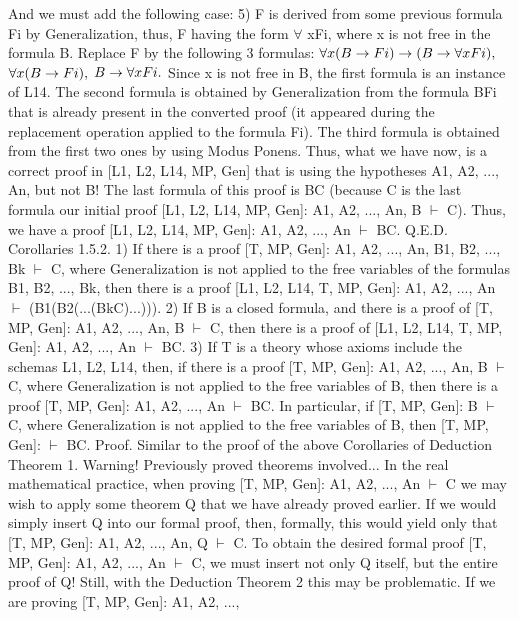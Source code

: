 And we must add the following case:
5) F is derived from some previous formula Fi by Generalization, thus, F having the form \(\forall\) xFi, where x
is not free in the formula B. Replace F by the following 3 formulas:
\(\forall x(B\rightarrow Fi)\rightarrow (B\rightarrow \forall xFi),\)
\(\forall x(B\rightarrow Fi),\)
\(B\rightarrow \forall xFi.\)
Since x is not free in B, the first formula is an instance of L14. The second formula is obtained by
Generalization from the formula B\IMPLIES Fi that is already present in the converted proof (it appeared during
the replacement operation applied to the formula Fi). The third formula is obtained from the first two ones
by using Modus Ponens.
Thus, what we have now, is a correct proof in [L1, L2, L14, MP, Gen] that is using the hypotheses A1,
A2, ..., An, but not B! The last formula of this proof is B\IMPLIES C (because C is the last formula our initial
proof [L1, L2, L14, MP, Gen]: A1, A2, ..., An, B \(\vdash\) C). Thus, we have a proof [L1, L2, L14, MP, Gen]: A1,
A2, ..., An \(\vdash\) B\IMPLIES C. Q.E.D.
Corollaries 1.5.2. 1) If there is a proof [T, MP, Gen]: A1, A2, ..., An, B1, B2, ..., Bk \(\vdash\) C, where
Generalization is not applied to the free variables of the formulas B1, B2, ..., Bk, then there is a proof [L1,
L2, L14, T, MP, Gen]: A1, A2, ..., An \(\vdash\) (B1\IMPLIES (B2\IMPLIES (...\IMPLIES (Bk\IMPLIES C)...))).
2) If B is a closed formula, and there is a proof of [T, MP, Gen]: A1, A2, ..., An, B \(\vdash\) C, then there is a
proof of [L1, L2, L14, T, MP, Gen]: A1, A2, ..., An \(\vdash\) B\IMPLIES C.
3) If T is a theory whose axioms include the schemas L1, L2, L14, then, if there is a proof [T, MP, Gen]:
A1, A2, ..., An, B \(\vdash\) C, where Generalization is not applied to the free variables of B, then there is a proof
[T, MP, Gen]: A1, A2, ..., An \(\vdash\) B\IMPLIES C. In particular, if [T, MP, Gen]: B \(\vdash\) C, where Generalization is not
applied to the free variables of B, then [T, MP, Gen]: \(\vdash\) B\IMPLIES C.
Proof. Similar to the proof of the above Corollaries of Deduction Theorem 1.
Warning! Previously proved theorems involved...
In the real mathematical practice, when proving [T, MP, Gen]: A1, A2, ..., An \(\vdash\) C we may wish to apply
some theorem Q that we have already proved earlier. If we would simply insert Q into our formal proof,
then, formally, this would yield only that [T, MP, Gen]: A1, A2, ..., An, Q \(\vdash\) C. To obtain the desired formal
proof [T, MP, Gen]: A1, A2, ..., An \(\vdash\) C, we must insert not only Q itself, but the entire proof of Q!
Still, with the Deduction Theorem 2 this may be problematic. If we are proving [T, MP, Gen]: A1, A2, ...,

